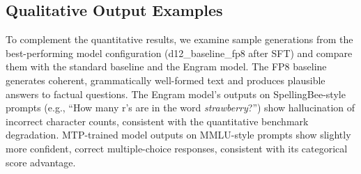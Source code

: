 \subsection{Qualitative Output Examples}

To complement the quantitative results, we examine sample generations from the best-performing
model configuration (d12\_baseline\_fp8 after SFT) and compare them with the standard baseline
and the Engram model. The FP8 baseline generates coherent, grammatically well-formed text and produces plausible answers to factual questions. The Engram model's outputs on SpellingBee-style prompts (e.g., ``How many r's are in the word \emph{strawberry}?'') show hallucination of incorrect character counts, consistent with the quantitative benchmark degradation. MTP-trained model outputs on MMLU-style prompts show slightly more confident, correct multiple-choice responses, consistent with its categorical score advantage.
